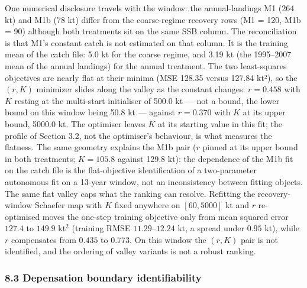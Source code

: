 \documentclass[11pt]{article}
\begin{document}
One numerical disclosure travels with the window: the annual-landings M1
(264 kt) and M1b (78 kt) differ from the coarse-regime recovery rows (M1
= 120, M1b = 90) although both treatments sit on the same SSB column.
The reconciliation is that M1's constant catch is not estimated on that
column. It is the training mean of the catch file: 5.0 kt for the coarse
regime, and 3.19 kt (the 1995--2007 mean of the annual landings) for the
annual treatment. The two least-squares objectives are nearly flat at
their minima (MSE 128.35 versus 127.84 kt²), so the \((r, K)\) minimizer
slides along the valley as the constant changes: \(r = 0.458\) with
\(K\) resting at the multi-start initialiser of 500.0 kt --- not a
bound, the lower bound on this window being 50.8 kt --- against
\(r = 0.370\) with \(K\) at its upper bound, 5000.0 kt. The optimiser
leaves \(K\) at its starting value in this fit; the profile of Section
3.2, not the optimiser's behaviour, is what measures the flatness. The
same geometry explains the M1b pair (\(r\) pinned at its upper bound in
both treatments; \(K = 105.8\) against 129.8 kt): the dependence of the
M1b fit on the catch file is the flat-objective identification of a
two-parameter autonomous fit on a 13-year window, not an inconsistency
between fitting objects. The same flat valley caps what the ranking can
resolve. Refitting the recovery-window Schaefer map with \(K\) fixed
anywhere on \([60, 5000]\) kt and \(r\) re-optimised moves the one-step
training objective only from mean squared error \(127.4\) to \(149.9\)
kt\(^2\) (training RMSE \(11.29\)--\(12.24\) kt, a spread under \(0.95\)
kt), while \(r\) compensates from \(0.435\) to \(0.773\). On this window
the \((r, K)\) pair is not identified, and the ordering of valley
variants is not a robust ranking.

\subsubsection{8.3 Depensation boundary
identifiability}\label{depensation-boundary-identifiability}
\end{document}
